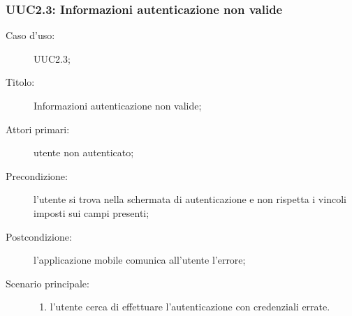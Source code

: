 \documentclass[../../../analisi-dei-requisiti.tex]{subfiles}
\begin{document}
\subsubsection{UUC2.3: Informazioni autenticazione non valide}%
\label{subs:UUC2.3}
\begin{description}
  \item[Caso d’uso:] UUC2.3;
  \item[Titolo:] Informazioni autenticazione non valide;
  \item[Attori primari:] utente non autenticato;
  \item[Precondizione:] l'utente si trova nella schermata di autenticazione e non rispetta i vincoli imposti sui campi presenti;
  \item[Postcondizione:] l'applicazione mobile comunica all'utente l'errore;
  \item[Scenario principale:]
        \begin{enumerate}
          \item l'utente cerca di effettuare l'autenticazione con credenziali errate.
        \end{enumerate}
\end{description}
\end{document}
